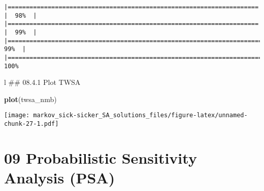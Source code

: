 \documentclass[
]{article}
\newenvironment{Shaded}{\begin{snugshade}}{\end{snugshade}}
\newcommand{\KeywordTok}[1]{\textcolor[rgb]{0.13,0.29,0.53}{\textbf{#1}}}
\newcommand{\NormalTok}[1]{#1}
\begin{document}
\begin{verbatim}
|===================================================================== |  98%  |                                                                              |===================================================================== |  99%  |                                                                              |======================================================================|  99%  |                                                                              |======================================================================| 100%
\end{verbatim}

l \#\# 08.4.1 Plot TWSA

\begin{Shaded}
\begin{Highlighting}[]
\KeywordTok{plot}\NormalTok{(twsa_nmb)}
\end{Highlighting}
\end{Shaded}

\texttt{[image: markov\_sick-sicker\_SA\_solutions\_files/figure-latex/unnamed-chunk-27-1.pdf]}

\hypertarget{probabilistic-sensitivity-analysis-psa}{%
\section{09 Probabilistic Sensitivity Analysis
(PSA)}\label{probabilistic-sensitivity-analysis-psa}}
\end{document}
